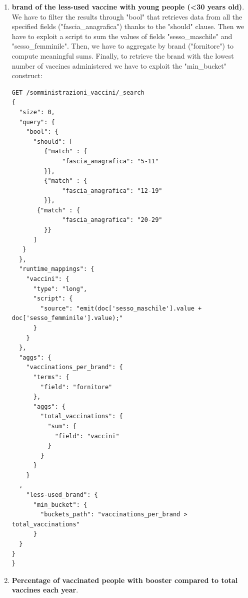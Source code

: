 \documentclass{article}
\begin{document}
\begin{enumerate}
\begin{lstlisting}
      },
      "aggs": {
        "vaccinati": {
          "sum": {
            "field": "prima_dose"
          }
        },
        "vaccinati_Lombardia": {
          "filter": {
            "term": {
              "nome_area": "Lombardia"
            }
          },
          "aggs": {
            "dosi": {
              "sum": {
                "field": "prima_dose"
              }
            }
          }
        },
        "vaccini_percentage": {
          "bucket_script": {
            "buckets_path": {
              "vaccinatiLombardia": "vaccinati_Lombardia>dosi",
              "vaccinati": "vaccinati"
            },
            "script": "params.vaccinatiLombardia / params.vaccinati * 100"
          }
        }
      }
    }
  }
}
\end{lstlisting}
\item \textbf{brand of the less-used vaccine with young people (<30 years old)}.\\
We have to filter the results through "bool" that retrieves data from all the specified fields ("fascia\_anagrafica") thanks to the "should" clause. Then we have to exploit a script to sum the values of fields "sesso\_maschile" and "sesso\_femminile". Then, we have to aggregate by brand ("fornitore") to compute meaningful sums. Finally, to retrieve the brand with the lowest number of vaccines administered we have to exploit the "min\_bucket" construct:
\begin{lstlisting}
GET /somministrazioni_vaccini/_search
{
  "size": 0,
  "query": {
    "bool": {
      "should": [
	     {"match" : {
	          "fascia_anagrafica": "5-11" 
	     }},
	     {"match" : {
	          "fascia_anagrafica": "12-19" 
	     }},
       {"match" : {
	          "fascia_anagrafica": "20-29" 
	     }}
      ]
   }
  },
  "runtime_mappings": {
    "vaccini": {
      "type": "long",
      "script": {
        "source": "emit(doc['sesso_maschile'].value + doc['sesso_femminile'].value);"
      }
    }
  },
  "aggs": {
    "vaccinations_per_brand": {
      "terms": {
        "field": "fornitore"
      },
      "aggs": {
        "total_vaccinations": {
          "sum": {
            "field": "vaccini"
          }
        }
      }
    }
  ,
    "less-used_brand": {
      "min_bucket": {
        "buckets_path": "vaccinations_per_brand > total_vaccinations" 
      }
  }
}
}
\end{lstlisting}
\item \textbf{Percentage of vaccinated people with booster compared to total vaccines each year}.\\

\end{enumerate}
\end{document}

